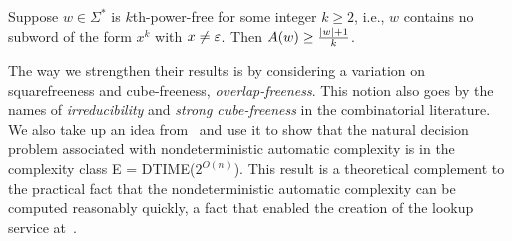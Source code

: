 	\begin{theorem}\label{thm:sw9}
		Suppose $w\in\Sigma^*$ is $k$th-power-free for some integer $k\ge 2$, i.e., $w$ contains no subword of the form $x^k$ with $x\ne\varepsilon$.
		Then $A(w)\ge\frac{\lvert w\rvert+1}k$.
	\end{theorem}
	The way we strengthen their results is by considering a variation
	on squarefreeness and cube-freeness, \emph{overlap-freeness}.
	This notion also goes by the names of \emph{irreducibility} and \emph{strong cube-freeness} in the combinatorial literature.
	We also take up an idea from~\cite[Theorem 8]{MR1897300} and use it to show that
	the natural decision problem associated with nondeterministic automatic complexity is in the complexity class E = DTIME($2^{O(n)}$).
	This result is a theoretical complement to the practical fact that
	the nondeterministic automatic complexity can be computed reasonably quickly, a fact that enabled the creation of the lookup service at~\cite{lookup}.

